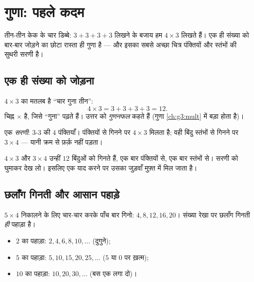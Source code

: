 \chapter{गुणा: पहले कदम}\label{ch:g2:mult}

तीन-तीन केक के चार डिब्बे: $3 + 3 + 3 + 3$ लिखने के बजाय हम
$4 \times 3$ लिखते हैं। एक ही संख्या को बार-बार जोड़ने का छोटा
रास्ता ही गुणा है --- और इसका सबसे अच्छा चित्र पंक्तियों और
स्तंभों की सुथरी सरणी है।

\section{एक ही संख्या को जोड़ना}

\begin{definition}[गुणा]\label{def:g2:mult:def}
$4 \times 3$ का मतलब है ``चार गुना तीन'':
\[
4 \times 3 = 3 + 3 + 3 + 3 = 12 .
\]
चिह्न $\times$ है, जिसे ``गुना'' पढ़ते हैं। उत्तर को
\emph{गुणनफल} कहते हैं (गुणा \cref{ch:g3:mult} में बड़ा होता है)।
\end{definition}

\begin{omfigure}

{\small एक \emph{सरणी}: $3$-$3$ की $4$ पंक्तियाँ। पंक्तियों से
गिनने पर $4 \times 3$ मिलता है; वही बिंदु स्तंभों से गिनने पर
$3 \times 4$ --- यानी क्रम से फ़र्क़ नहीं पड़ता।}
\end{omfigure}

\begin{example}[क्रम से फ़र्क़ नहीं पड़ता]\label{ex:g2:mult:order}
$4 \times 3$ और $3 \times 4$ उन्हीं $12$ बिंदुओं को गिनते हैं,
एक बार पंक्तियों से, एक बार स्तंभों से। सरणी को घुमाकर देख लो।
इसलिए एक  याद करने पर उसका जुड़वाँ मुफ़्त में मिल जाता है।
\end{example}

\section{छलाँग गिनती और आसान पहाड़े}

\begin{method}[छलाँग गिनकर पहाड़ा बनाना]\label{met:g2:mult:skip}
$5 \times 4$ निकालने के लिए चार-चार करके पाँच बार गिनो:
$4, 8, 12, 16, 20$। संख्या रेखा पर छलाँग गिनती \emph{ही}
पहाड़ा है।
\begin{itemize}
  \item $2$ का पहाड़ा: $2, 4, 6, 8, 10, \dots$ (दुगुने);
  \item $5$ का पहाड़ा: $5, 10, 15, 20, 25, \dots$ ($5$ या $0$
        पर ख़त्म);
  \item $10$ का पहाड़ा: $10, 20, 30, \dots$ (बस एक  लगा दो)।
\end{itemize}
\end{method}

